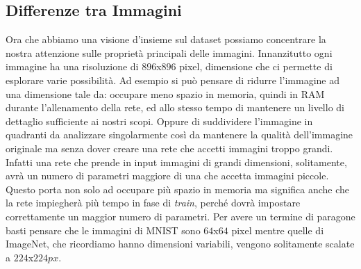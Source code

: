 \subsection{Differenze tra Immagini}
Ora che abbiamo una visione d'insieme sul dataset possiamo concentrare la nostra attenzione sulle proprietà principali delle immagini.
Innanzitutto ogni immagine ha una risoluzione di $896$x$896$ pixel, dimensione che ci permette di esplorare varie possibilità.
Ad esempio si può pensare di ridurre l'immagine ad una dimensione tale da: occupare meno spazio in memoria, quindi in RAM durante l'allenamento della rete, ed allo stesso tempo di mantenere un livello di dettaglio sufficiente ai nostri scopi.
Oppure di suddividere l'immagine in quadranti da analizzare singolarmente così da mantenere la qualità dell'immagine originale ma senza dover creare una rete che accetti immagini troppo grandi.
Infatti una rete che prende in input immagini di grandi dimensioni, solitamente, avrà un numero di parametri maggiore di una che accetta immagini piccole.
Questo porta non solo ad occupare più spazio in memoria ma significa anche che la rete impiegherà più tempo in fase di \textit{train}, perché dovrà impostare correttamente un maggior numero di parametri.
Per avere un termine di paragone basti pensare che le immagini di MNIST sono $64$x$64$ pixel mentre quelle di ImageNet, che ricordiamo hanno dimensioni variabili, vengono solitamente scalate a $224$x$224px$. 

